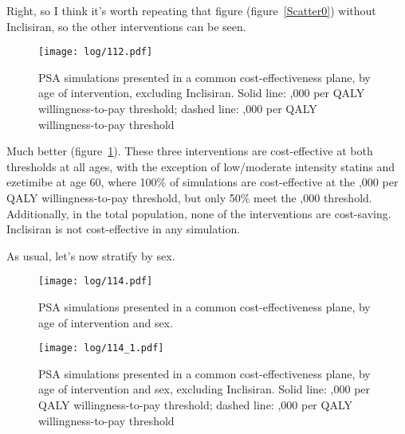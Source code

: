 \documentclass[11pt]{article}
\begin{document}
Right, so I think it's worth repeating that figure (figure~\ref{Scatter0})
without Inclisiran, so the other interventions can be seen. 

\color{Blue4}
\begin{stlog}\end{stlog}
\begin{figure}
    \centering
    \texttt{[image: log/112.pdf]}
    \caption{PSA simulations presented in a common cost-effectiveness plane, by age of intervention, excluding Inclisiran. Solid line: ,000 per QALY willingness-to-pay threshold; dashed line: ,000 per QALY willingness-to-pay threshold}
    \label{Scatter1}
\end{figure}
\begin{stlog}\end{stlog}
\color{black}

Much better (figure~\ref{Scatter1}). 
These three interventions are cost-effective at both thresholds at all ages, with 
the exception of low/moderate intensity statins and ezetimibe at age 60, 
where 100\% of simulations are cost-effective at the ,000 
per QALY willingness-to-pay threshold, but only 50\% meet the ,000 threshold. Additionally, in the total population, none of the interventions
are cost-saving. Inclisiran is not cost-effective in any simulation. 

As usual, let's now stratify by sex.

\color{Blue4}
\begin{stlog}\end{stlog}
\begin{figure}
    \centering
    \texttt{[image: log/114.pdf]}
    \caption{PSA simulations presented in a common cost-effectiveness plane, by age of intervention and sex.}
    \label{Scatter0sex}
\end{figure}
\begin{figure}
    \centering
    \texttt{[image: log/114\_1.pdf]}
    \caption{PSA simulations presented in a common cost-effectiveness plane, by age of intervention and sex, excluding Inclisiran. Solid line: ,000 per QALY willingness-to-pay threshold; dashed line: ,000 per QALY willingness-to-pay threshold}
    \label{Scatter1sex}
\end{figure}
\begin{stlog}\end{stlog}
\color{black}
\end{document}

